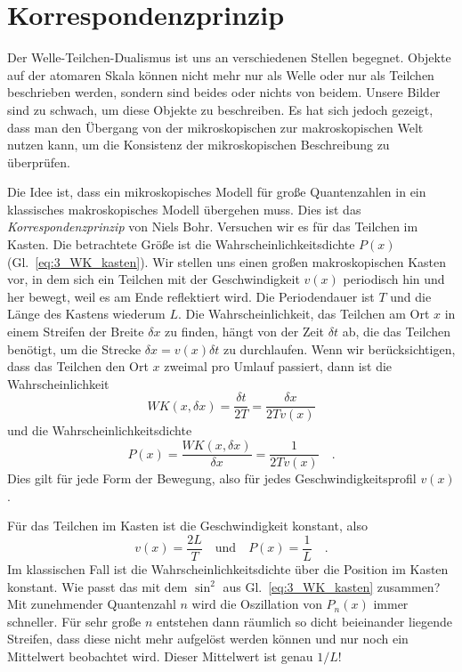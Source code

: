 \section{Korrespondenzprinzip}
Der Welle-Teilchen-Dualismus ist uns an verschiedenen Stellen begegnet. Objekte auf der atomaren Skala können nicht mehr nur als Welle oder nur als Teilchen beschrieben werden, sondern sind beides oder nichts von beidem. Unsere Bilder sind zu schwach, um diese Objekte zu beschreiben. Es hat sich jedoch gezeigt, dass man den Übergang von der mikroskopischen zur makroskopischen Welt nutzen kann, um die Konsistenz der mikroskopischen Beschreibung zu überprüfen. 

Die Idee ist, dass ein mikroskopisches Modell für große Quantenzahlen in ein klassisches makroskopisches Modell übergehen muss. Dies ist das \emph{Korrespondenzprinzip} von Niels Bohr. Versuchen wir es für das Teilchen im Kasten. Die betrachtete Größe ist die Wahrscheinlichkeitsdichte $P(x)$ (Gl.~\ref{eq:3_WK_kasten}). Wir stellen uns einen großen makroskopischen Kasten vor, in dem sich ein Teilchen mit der Geschwindigkeit $v(x)$ periodisch hin und her bewegt, weil es am Ende reflektiert wird. Die Periodendauer ist $T$ und die Länge des Kastens wiederum $L$. Die Wahrscheinlichkeit, das Teilchen am Ort $x$ in einem Streifen der Breite $\delta x$ zu finden, hängt von der Zeit $\delta t$ ab, die das Teilchen benötigt, um die Strecke $\delta x = v(x) \delta t$ zu durchlaufen. Wenn wir berücksichtigen, dass das Teilchen den Ort $x$ zweimal pro Umlauf passiert, dann ist die Wahrscheinlichkeit
\begin{equation}
    WK(x, \delta x) = \frac{\delta t}{2 T } = \frac{\delta x}{2T v(x)}
\end{equation} 
und die Wahrscheinlichkeitsdichte
\begin{equation}
    P(x) = \frac{WK(x, \delta x)}{\delta x} = \frac{1}{2 T v(x)} \quad .
\end{equation}
Dies gilt für jede Form der Bewegung, also für jedes Geschwindigkeitsprofil $v(x)$.

Für das Teilchen im Kasten ist die Geschwindigkeit konstant, also
\begin{equation}
    v(x) = \frac{2L}{T} \quad \text{und} \quad P(x) = \frac{1}{L} \quad .
\end{equation}
Im klassischen Fall ist die Wahrscheinlichkeitsdichte über die Position im Kasten konstant. Wie passt das mit dem $\sin^2$ aus Gl.~\ref{eq:3_WK_kasten} zusammen? Mit zunehmender Quantenzahl $n$ wird die Oszillation von $P_n(x)$ immer schneller. Für sehr große $n$ entstehen dann räumlich so dicht beieinander liegende Streifen, dass diese nicht mehr aufgelöst werden können und nur noch ein Mittelwert beobachtet wird. Dieser Mittelwert ist genau $1/L$!


